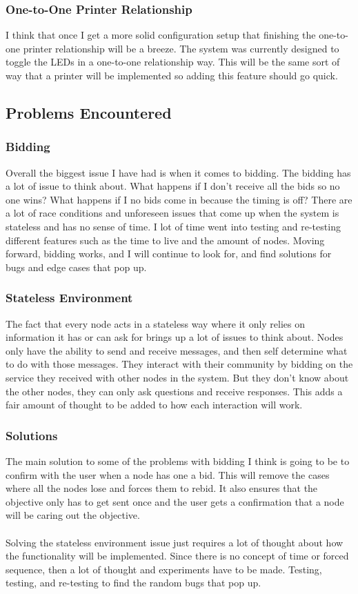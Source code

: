 \documentclass[draftclsnofoot, onecolumn, compsoc, 10pt]{IEEEtran}
\begin{document}
\subsubsection{One-to-One Printer Relationship}
I think that once I get a more solid configuration setup that finishing the one-to-one printer relationship will be a breeze. The system was currently designed to toggle the LEDs in a one-to-one relationship way. This will be the same sort of way that a printer will be implemented so adding this feature should go quick. 

\subsection{Problems Encountered}
\subsubsection{Bidding}
Overall the biggest issue I have had is when it comes to bidding. The bidding has a lot of issue to think about. What happens if I don't receive all the bids so no one wins? What happens if I no bids come in because the timing is off? There are a lot of race conditions and unforeseen issues that come up when the system is stateless and has no sense of time. I lot of time went into testing and re-testing different features such as the time to live and the amount of nodes. Moving forward, bidding works, and I will continue to look for, and find solutions for bugs and edge cases that pop up.

\subsubsection{Stateless Environment}
The fact that every node acts in a stateless way where it only relies on information it has or can ask for brings up a lot of issues to think about. Nodes only have the ability to send and receive messages, and then self determine what to do with those messages. They interact with their community by bidding on the service they received with other nodes in the system. But they don't know about the other nodes, they can only ask questions and receive responses. This adds a fair amount of thought to be added to how each interaction will work.

\subsubsection{Solutions}
The main solution to some of the problems with bidding I think is going to be to confirm with the user when a node has one a bid. This will remove the cases where all the nodes lose and forces them to rebid. It also ensures that the objective only has to get sent once and the user gets a confirmation that a node will be caring out the objective.
\\ \\
Solving the stateless environment issue just requires a lot of thought about how the functionality will be implemented. Since there is no concept of time or forced sequence, then a lot of thought and experiments have to be made. Testing, testing, and re-testing to find the random bugs that pop up.
\end{document}
